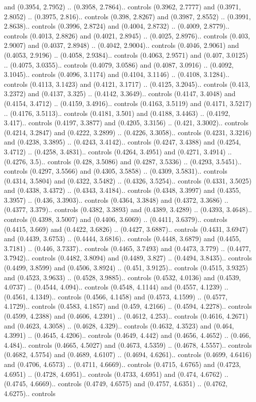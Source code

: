 and (0.3954, 2.7952) .. (0.3958, 2.7864).. controls (0.3962, 2.7777) and (0.3971, 2.8052) .. (0.3975, 2.816).. controls (0.398, 2.8267) and (0.3987, 2.8552) .. (0.3991, 2.8638).. controls (0.3996, 2.8724) and (0.4004, 2.8732) .. (0.4009, 2.8779).. controls (0.4013, 2.8826) and (0.4021, 2.8945) .. (0.4025, 2.8976).. controls (0.403, 2.9007) and (0.4037, 2.8948) .. (0.4042, 2.9004).. controls (0.4046, 2.9061) and (0.4053, 2.9196) .. (0.4058, 2.9384).. controls (0.4063, 2.9571) and (0.407, 3.0125) .. (0.4075, 3.0355).. controls (0.4079, 3.0586) and (0.4087, 3.0916) .. (0.4092, 3.1045).. controls (0.4096, 3.1174) and (0.4104, 3.1146) .. (0.4108, 3.1284).. controls (0.4113, 3.1423) and (0.4121, 3.1717) .. (0.4125, 3.2045).. controls (0.413, 3.2372) and (0.4137, 3.325) .. (0.4142, 3.3649).. controls (0.4147, 3.4048) and (0.4154, 3.4712) .. (0.4159, 3.4916).. controls (0.4163, 3.5119) and (0.4171, 3.5217) .. (0.4176, 3.5113).. controls (0.4181, 3.501) and (0.4188, 3.4463) .. (0.4192, 3.417).. controls (0.4197, 3.3877) and (0.4205, 3.3156) .. (0.421, 3.3002).. controls (0.4214, 3.2847) and (0.4222, 3.2899) .. (0.4226, 3.3058).. controls (0.4231, 3.3216) and (0.4238, 3.3895) .. (0.4243, 3.4142).. controls (0.4247, 3.4388) and (0.4254, 3.4712) .. (0.4258, 3.4831).. controls (0.4264, 3.4951) and (0.4271, 3.4914) .. (0.4276, 3.5).. controls (0.428, 3.5086) and (0.4287, 3.5336) .. (0.4293, 3.5451).. controls (0.4297, 3.5566) and (0.4305, 3.5858) .. (0.4309, 3.5831).. controls (0.4314, 3.5804) and (0.4322, 3.5482) .. (0.4326, 3.5254).. controls (0.4331, 3.5025) and (0.4338, 3.4372) .. (0.4343, 3.4184).. controls (0.4348, 3.3997) and (0.4355, 3.3957) .. (0.436, 3.3903).. controls (0.4364, 3.3848) and (0.4372, 3.3686) .. (0.4377, 3.379).. controls (0.4382, 3.3893) and (0.4389, 3.4289) .. (0.4393, 3.4648).. controls (0.4398, 3.5007) and (0.4406, 3.6069) .. (0.4411, 3.6379).. controls (0.4415, 3.669) and (0.4422, 3.6826) .. (0.4427, 3.6887).. controls (0.4431, 3.6947) and (0.4439, 3.6753) .. (0.4444, 3.6816).. controls (0.4448, 3.6879) and (0.4455, 3.7181) .. (0.446, 3.7337).. controls (0.4465, 3.7493) and (0.4473, 3.779) .. (0.4477, 3.7942).. controls (0.4482, 3.8094) and (0.4489, 3.827) .. (0.4494, 3.8435).. controls (0.4499, 3.8599) and (0.4506, 3.8924) .. (0.451, 3.9125).. controls (0.4515, 3.9325) and (0.4523, 3.9633) .. (0.4528, 3.9885).. controls (0.4532, 4.0136) and (0.4539, 4.0737) .. (0.4544, 4.094).. controls (0.4548, 4.1144) and (0.4557, 4.1239) .. (0.4561, 4.1349).. controls (0.4566, 4.1458) and (0.4573, 4.1599) .. (0.4577, 4.1729).. controls (0.4583, 4.1857) and (0.459, 4.2166) .. (0.4594, 4.2278).. controls (0.4599, 4.2388) and (0.4606, 4.2391) .. (0.4612, 4.253).. controls (0.4616, 4.2671) and (0.4623, 4.3058) .. (0.4628, 4.329).. controls (0.4632, 4.3523) and (0.464, 4.3991) .. (0.4645, 4.4206).. controls (0.4649, 4.442) and (0.4656, 4.4652) .. (0.466, 4.484).. controls (0.4665, 4.5027) and (0.4673, 4.5359) .. (0.4678, 4.5557).. controls (0.4682, 4.5754) and (0.4689, 4.6107) .. (0.4694, 4.6261).. controls (0.4699, 4.6416) and (0.4706, 4.6573) .. (0.4711, 4.6669).. controls (0.4715, 4.6765) and (0.4723, 4.6951) .. (0.4728, 4.6951).. controls (0.4733, 4.6951) and (0.474, 4.6762) .. (0.4745, 4.6669).. controls (0.4749, 4.6575) and (0.4757, 4.6351) .. (0.4762, 4.6275).. controls 